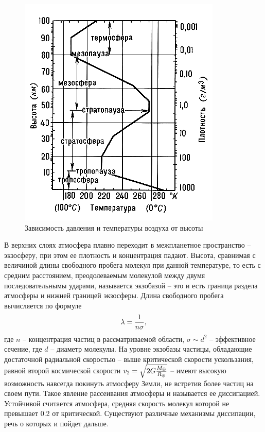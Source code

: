 \documentclass[12pt,a4paper]{article}
\begin{document}
\begin{figure}[htp]
    \centering
    \includegraphics[width=0.6\linewidth]{atmosphere_layers.png}
    \caption{Зависимость давления и температуры воздуха от высоты \cite{pressure}}
\end{figure}

В верхних слоях атмосфера плавно переходит в межпланетное пространство -- экзосферу, при этом ее плотность и концентрация падают.
Высота, сравнимая с величиной длины свободного пробега молекул при данной температуре, то есть с средним расстоянием, преодолеваемым молекулой между двумя последовательнымы ударами, называется экзобазой -- это и есть граница раздела атмосферы и нижней границей экзосферы. 
Длина свободного пробега вычисляется по формуле
\begin{equation}
    \lambda = {1 \over n \sigma},
\end{equation}
где $n$ -- концентрация частиц в рассматриваемой области, $\sigma \sim d^2$ -- эффективное сечение, где $d$ -- диаметр молекулы.
На уровне экзобазы частицы, обладающие достаточной радиальной скоростью -- выше критической скорости ускользания, равной второй космической скорости $v_2 = \sqrt {2G{M_\oplus \over R_\oplus}}$ -- имеют высокую возможность навсегда покинуть атмосферу Земли, не встретив более частиц на своем пути.
Такое явление рассеивания атмосферы и называется ее диссипацией.
Устойчивой считается атмосфера, средняя скорость молекул которой не превышает 0.2 от критической. 
Существуют различные механизмы диссипации, речь о которых и пойдет дальше.
\end{document}
